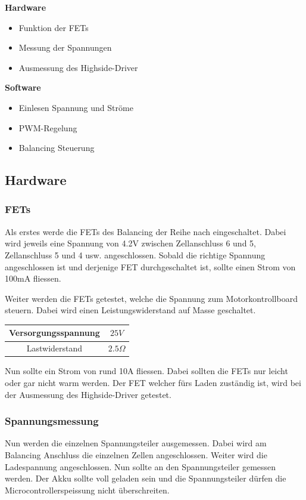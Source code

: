 \textbf{Hardware}
\begin{itemize}
	\item Funktion der FETs
	\item Messung der Spannungen
	\item Ausmessung des Highside-Driver
\end{itemize}
\textbf{Software}
\begin{itemize}
	\item Einlesen Spannung und Ströme
	\item PWM-Regelung
	\item Balancing Steuerung
\end{itemize}

\subsection*{Hardware}
\subsubsection*{FETs}
Als erstes werde die FETs des Balancing der Reihe nach eingeschaltet. Dabei wird jeweils eine Spannung von 4.2V zwischen Zellanschluss 6 und 5, Zellanschluss 5 und 4 usw. angeschlossen. Sobald die richtige Spannung angeschlossen ist und derjenige FET durchgeschaltet ist, sollte einen Strom von 100mA fliessen.

Weiter werden die FETs getestet, welche die Spannung zum Motorkontrollboard steuern. Dabei wird einen Leistungswiderstand auf Masse geschaltet. 
\begin{center}
	\begin{tabular}{|c|c|}
		\hline 
		Versorgungsspannung & $25V$ \\ \hline
		Lastwiderstand & $2.5\Omega$ \\ \hline
	\end{tabular} 
	\label{tab:fetmessbedzumotorcontrol}
\end{center}

Nun sollte ein Strom von rund 10A fliessen. Dabei sollten die FETs nur leicht oder gar nicht warm werden. Der FET welcher fürs Laden zuständig ist, wird bei der Ausmessung des Highside-Driver getestet.

\subsubsection*{Spannungsmessung}
Nun werden die einzelnen Spannungsteiler ausgemessen. Dabei wird am Balancing Anschluss die einzelnen Zellen angeschlossen. Weiter wird die Ladespannung angeschlossen. Nun sollte an den Spannungsteiler gemessen werden. Der Akku sollte voll geladen sein und die Spannungsteiler dürfen die Microcontrollerspeissung nicht überschreiten.

